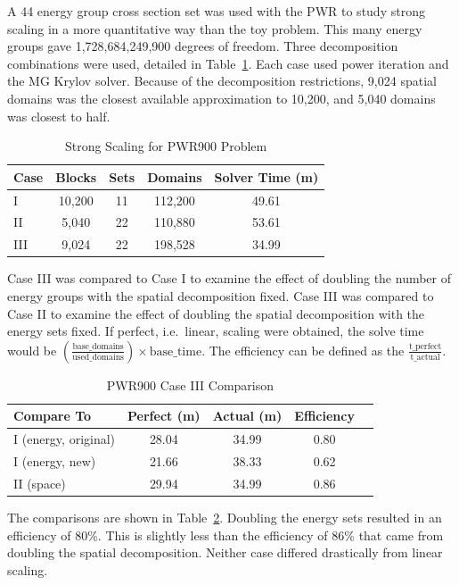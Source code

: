 A 44 energy group cross section set was used with the PWR to study strong scaling in a more quantitative way than the toy problem. This many energy groups gave 1,728,684,249,900 degrees of freedom. Three decomposition combinations were used, detailed in Table~\ref{table:StrongCasesPWR}. Each case used power iteration and the MG Krylov solver. Because of the decomposition restrictions, 9,024 spatial domains was the closest available approximation to 10,200, and 5,040 domains was closest to half.
%
\begin{table}[!h]
\caption{Strong Scaling for PWR900 Problem}
\begin{center}
\begin{tabular}{l c c c c}
\hline
Case & Blocks & Sets & Domains & Solver Time (m) \\[0.5ex]
\hline
I   & 10,200 & 11 & 112,200 & 49.61 \\
II  & 5,040   & 22 & 110,880 & 53.61 \\
III & 9,024   & 22 & 198,528 & 34.99 \\
\hline
\end{tabular}
\end{center}
\label{table:StrongCasesPWR}
\end{table}

Case III was compared to Case I to examine the effect of doubling the number of energy groups with the spatial decomposition fixed. Case III was compared to Case II to examine the effect of doubling the spatial decomposition with the energy sets fixed. If perfect, i.e.\ linear, scaling were obtained, the solve time would be $(\frac{\text{base\_domains}}{\text{used\_domains}}) \times \text{base\_time}$. The efficiency can be defined as the $\frac{\text{t\_perfect}}{\text{t\_actual}}$. 

\begin{table}[!h]
\caption{PWR900 Case III Comparison}
\begin{center}
\begin{tabular}{l c c c c}
\hline
Compare To & Perfect (m) & Actual (m) & Efficiency \\[0.5ex]
\hline
I  (energy, original) & 28.04 & 34.99 & 0.80 \\
I  (energy, new)      & 21.66 & 38.33 & 0.62 \\
II  (space)               & 29.94  & 34.99 & 0.86 \\
\hline
\end{tabular}
\end{center}
\label{table:StrongPWRresults}
\end{table}
%
The comparisons are shown in Table~\ref{table:StrongPWRresults}. Doubling the energy sets resulted in an efficiency of 80\%. This is slightly less than the efficiency of 86\% that came from doubling the spatial decomposition. Neither case differed drastically from linear scaling. 


